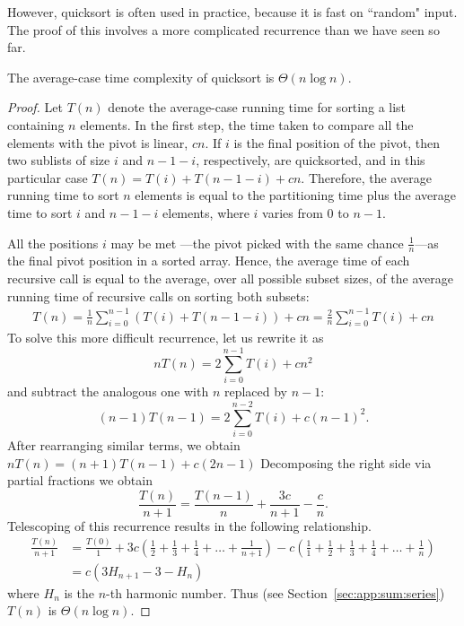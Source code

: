 However, quicksort is often used in practice, because it is fast on ``random" 
input. The proof of this involves a more complicated recurrence than we have 
seen so far.

\begin{Lemma}\label{lem:qsort:ave:comp}
The average-case time complexity of quicksort is \(\Theta(n\log n)\).
\end{Lemma}
\begin{proof}
Let $T(n)$ denote the average-case running time for sorting a list containing 
$n$ elements. In the first step, the time taken to compare all the elements with 
the pivot is linear, $cn$. If $i$ is the final position of the pivot,
then two sublists of size $i$ and $n-1-i$, respectively,
are quicksorted, and in this particular case \(T(n)=T(i)+T(n-1-i)+cn\). 
Therefore, the average running time to sort $n$ elements is equal to the
partitioning time plus the average time to sort $i$ and $n-1-i$ elements, where
$i$ varies from $0$ to $n-1$.

All the positions $i$ may be met ---the pivot picked 
with the same chance \(\frac{1}{n}\)---as the final pivot position in a sorted
array.  Hence, the average time of each recursive call is equal to the 
average, over all possible subset sizes, of the average running time of 
recursive calls on sorting both subsets:
\begin{eqnarray*}
T(n) = \frac{1}{n} \sum\limits_{i=0}^{n-1} \left(T(i)+T(n-1-i)\right) +cn
= \frac{2}{n}\sum\limits_{i=0}^{n-1}T(i)+cn
\end{eqnarray*}
To solve this more difficult recurrence, let us rewrite it as
$$
nT(n)  = 2 \sum_{i=0}^{n-1}T(i) + cn^{2}
$$ 
and subtract the analogous one with $n$ replaced by $n-1$:
$$
(n-1)T(n-1)  = 2\sum_{i=0}^{n-2}T(i) + c(n-1)^{2}.
$$ 
After rearranging similar terms, we obtain
\(
nT(n)=(n+1)T(n-1)+c(2n-1) %
\)
Decomposing the right side via partial fractions we obtain
$$
\frac{T(n)}{n+1} =
\frac{T(n-1)}{n} + \frac{3c}{n+1} - \frac{c}{n}. %
$$
Telescoping of this recurrence results in the following relationship.
\begin{align*}
\frac{T(n)}{n+1} & = \frac{T(0)}{1}  +
3c\left (
\frac{1}{2}+\frac{1}{3}+\frac{1}{4}+\ldots+\frac{1}{n+1} 
\right ) - c\left (
\frac{1}{1} + \frac{1}{2}+\frac{1}{3}+\frac{1}{4}+\ldots+\frac{1}{n}
\right ) \\
& =  c (3H_{n+1}-3-H_{n})
 \end{align*}
where \(H_{n}\) is the $n$-th harmonic number.
Thus (see Section~\ref{sec:app:sum:series}) $T(n)$ is $\Theta(n \log n)$.
\end{proof}

